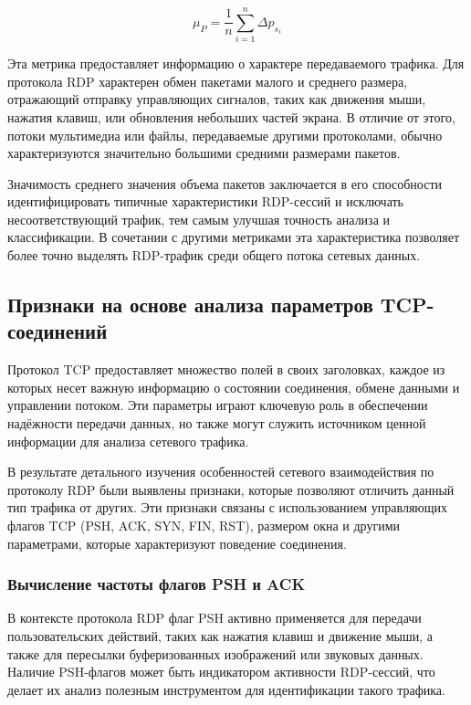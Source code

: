 \documentclass[bachelor, och, coursework]{SCWorks}
\begin{document}
\begin{equation}
  \mu_P = \frac{1}{n} \sum_{i=1}^{n} \Delta p_{s_i}
\end{equation}

Эта метрика предоставляет информацию о характере передаваемого трафика. Для протокола RDP характерен обмен пакетами малого и среднего 
размера, отражающий отправку управляющих сигналов, таких как движения мыши, нажатия клавиш, или обновления небольших частей экрана. В 
отличие от этого, потоки мультимедиа или файлы, передаваемые другими протоколами, обычно характеризуются значительно большими средними 
размерами пакетов.

Значимость среднего значения объема пакетов заключается в его способности идентифицировать типичные характеристики RDP-сессий и исключать 
несоответствующий трафик, тем самым улучшая точность анализа и классификации. В сочетании с другими метриками эта характеристика позволяет 
более точно выделять RDP-трафик среди общего потока сетевых данных.

\subsection{Признаки на основе анализа параметров TCP-соединений}

Протокол TCP предоставляет множество полей в своих заголовках, каждое из которых несет важную информацию о состоянии соединения, обмене данными и 
управлении потоком. Эти параметры играют ключевую роль в обеспечении надёжности передачи данных, но также могут служить источником ценной информации 
для анализа сетевого трафика.

В результате детального изучения особенностей сетевого взаимодействия по протоколу RDP были выявлены признаки, которые позволяют отличить данный 
тип трафика от других. Эти признаки связаны с использованием управляющих флагов TCP (PSH, ACK, SYN, FIN, RST), размером окна и другими параметрами, 
которые характеризуют поведение соединения.


\subsubsection{Вычисление частоты флагов PSH и ACK}

В контексте протокола RDP флаг PSH активно применяется для передачи пользовательских действий, таких как нажатия клавиш и движение мыши, 
а также для пересылки буферизованных изображений или звуковых данных. Наличие PSH-флагов может быть индикатором активности RDP-сессий, 
что делает их анализ полезным инструментом для идентификации такого трафика.
\end{document}
